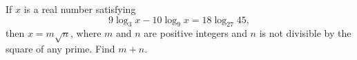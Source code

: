 If $x$ is a real number satisfying
\[9\log_3x-10\log_9x=18\log_{27}45,\]
then $x=m\sqrt n$, where $m$ and $n$ are positive integers and $n$ is not divisible by the square of any prime. Find $m+n$.

